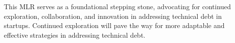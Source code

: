 \documentclass[manuscript]{acmart}
\begin{document}
This MLR serves as a foundational stepping stone, advocating for continued exploration, collaboration, and innovation in addressing technical debt in startups.
Continued exploration will pave the way for more adaptable and effective strategies in addressing technical debt.


\balance
%
%



% 
\end{document}
